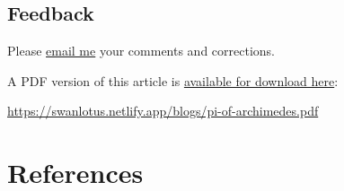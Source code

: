\documentclass[
  a4paper,
]{article}
\begin{document}
\subsection{Feedback}\label{feedback}

Please \href{mailto:feedback.swanlotus@gmail.com}{email me} your
comments and corrections.

\noindent A PDF version of this article is
\href{./pi-of-archimedes.pdf}{available for download here}:

\begin{small}

\begin{sffamily}

\url{https://swanlotus.netlify.app/blogs/pi-of-archimedes.pdf}

\end{sffamily}

\end{small}

\section*{References}\label{bibliography}
\end{document}
